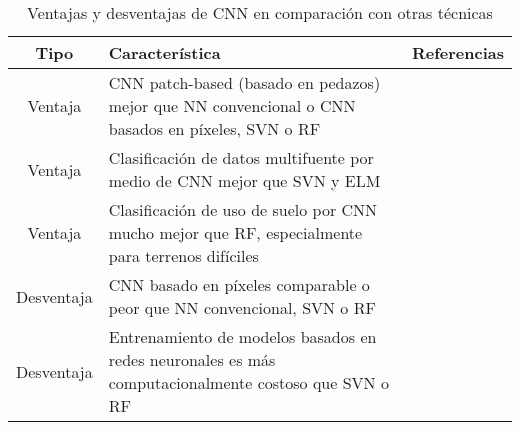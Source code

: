 \begin{center}
    \vspace{-\topsep}
    \begin{table}[h!]
        \begin{tabular}{ |c|m{11cm}|c| }
            \hline
            \bf Tipo & \bf Característica & \bf Referencias \\
            \hline
            Ventaja & CNN patch-based (basado en pedazos) mejor que NN convencional o CNN basados en píxeles, SVN o RF & \autocite{sharma-2017} \\
            \hline
            Ventaja & Clasificación de datos multifuente por medio de CNN mejor que SVN y ELM & \autocite{xu-2017} \\
            \hline
            Ventaja & Clasificación de uso de suelo por CNN mucho mejor que RF, especialmente para terrenos difíciles & \autocite{rezaee-2018} \\
            \hline
            Desventaja & CNN basado en píxeles comparable o peor que NN convencional, SVN o RF & \autocite{sharma-2017} \\
            \hline
            Desventaja & Entrenamiento de modelos basados en redes neuronales es más computacionalmente costoso que SVN o RF & \autocite{sharma-2017,xu-2017,rezaee-2018} \\
            \hline
        \end{tabular}
        \caption{Ventajas y desventajas de CNN en comparación con otras técnicas}
        \label{table:2}
    \end{table}
    \vspace{-\topsep}
\end{center}

